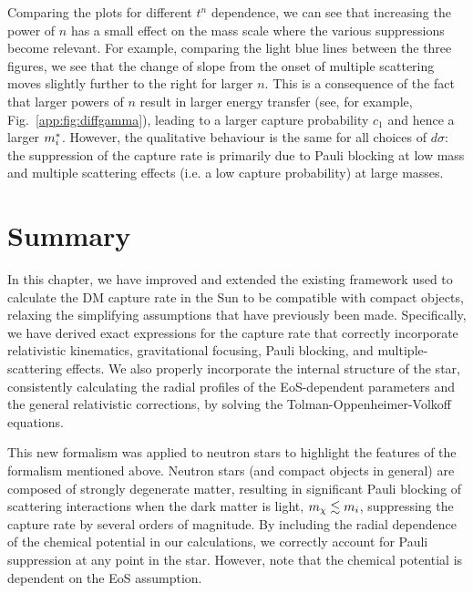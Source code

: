 Comparing the plots for different $t^n$ dependence, we can see that increasing the power of $n$ has a small effect on the mass scale where the various suppressions become relevant. For example, comparing the light blue lines between the three figures, we see that the change of slope from the onset of multiple scattering moves slightly further to the right for larger $n$. This is a consequence of the fact that larger powers of $n$ result in larger energy transfer (see, for example, Fig.~\ref{app:fig:diffgamma}), leading to a larger capture probability $c_1$ and hence a larger $m_i^*$.
However, the qualitative behaviour is the same for all choices of $d\sigma$: the suppression of the capture rate is primarily due to Pauli blocking at low mass and multiple scattering effects (i.e. a low capture probability) at large masses.


\section{Summary}
\label{ch3:sec:conclusion}


In this chapter, we have improved and extended the existing framework used to calculate the DM capture rate in the Sun to be compatible with compact objects, relaxing the simplifying assumptions that have previously been made. Specifically, we have derived exact expressions for the capture rate that correctly incorporate relativistic kinematics, gravitational focusing, Pauli blocking, and multiple-scattering effects. We also properly incorporate the internal structure of the star, consistently calculating the radial profiles of the EoS-dependent parameters and the general relativistic corrections, by solving the Tolman-Oppenheimer-Volkoff equations.

This new formalism was applied to neutron stars to highlight the features of the formalism mentioned above.
Neutron stars (and compact objects in general) are composed of strongly degenerate matter, resulting in significant Pauli blocking of scattering interactions when the dark matter is light, $m_\chi\lesssim m_i$, suppressing the capture rate by several orders of magnitude. By including the radial dependence of the chemical potential in our calculations, we correctly account for Pauli suppression at any point in the star. However, note that the chemical potential is dependent on the EoS assumption.


